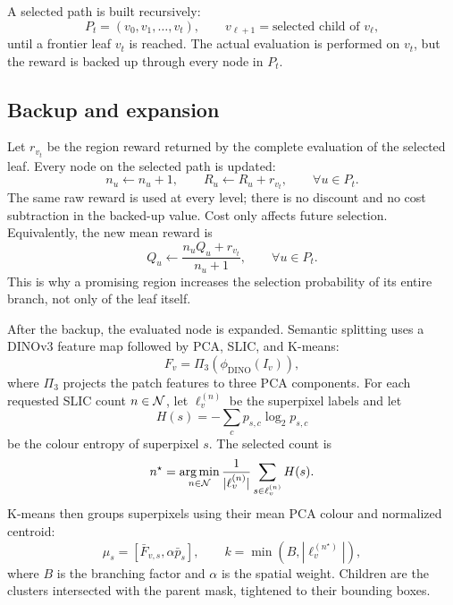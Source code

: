 A selected path is built recursively:
\begin{equation}
  P_t = (v_0, v_1, \ldots, v_t),
  \qquad
  v_{\ell+1} = \text{selected child of } v_{\ell},
\end{equation}
until a frontier leaf \(v_t\) is reached. The actual evaluation is performed on
\(v_t\), but the reward is backed up through every node in \(P_t\).

\subsection{Backup and expansion}

Let \(r_{v_t}\) be the region reward returned by the complete evaluation of the
selected leaf. Every node on the selected path is updated:
\begin{equation}
  n_u \leftarrow n_u + 1,
  \qquad
  R_u \leftarrow R_u + r_{v_t},
  \qquad
  \forall u \in P_t.
  \label{eq:backup}
\end{equation}
The same raw reward is used at every level; there is no discount and no cost
subtraction in the backed-up value. Cost only affects future selection.
Equivalently, the new mean reward is
\begin{equation}
  Q_u \leftarrow
  \frac{n_u Q_u + r_{v_t}}{n_u + 1},
  \qquad
  \forall u \in P_t.
\end{equation}
This is why a promising region increases the selection probability of its entire
branch, not only of the leaf itself.

After the backup, the evaluated node is expanded. Semantic splitting uses a
DINOv3 feature map followed by PCA, SLIC, and K-means:
\begin{equation}
  F_v = \Pi_3\!\left(\phi_{\mathrm{DINO}}(I_v)\right),
\end{equation}
where \(\Pi_3\) projects the patch features to three PCA components. For each
requested SLIC count \(n\in\mathcal{N}\), let \(\ell^{(n)}_v\) be the superpixel
labels and let
\begin{equation}
  H(s) = - \sum_{c} p_{s,c} \log_2 p_{s,c}
\end{equation}
be the colour entropy of superpixel \(s\). The selected count is
\begin{equation}
  n^{\star}
  = \operatorname*{arg\,min}_{n\in\mathcal{N}}
    \frac{1}{|\ell^{(n)}_v|}
    \sum_{s\in \ell^{(n)}_v} H(s).
  \label{eq:slic-entropy}
\end{equation}
K-means then groups superpixels using their mean PCA colour and normalized
centroid:
\begin{equation}
  \mu_s = \left[ \bar{F}_{v,s}, \alpha \bar{p}_s \right],
  \qquad
  k = \min(B, |\ell^{(n^{\star})}_v|),
\end{equation}
where \(B\) is the branching factor and \(\alpha\) is the spatial weight.
Children are the clusters intersected with the parent mask, tightened to their
bounding boxes.

